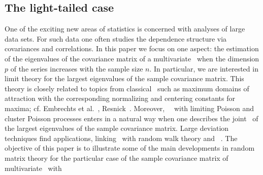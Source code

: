 \subsection{The light-tailed case}
One of the exciting new areas of statistics is concerned with analyses of large data sets.
For such data one often studies the dependence structure via covariances and correlations.
In this paper we focus on one aspect: the estimation of the eigenvalues of the covariance matrix of a multivariate  \ts\
when the dimension $p$ of the series increases with the sample size $n$. In particular, we are interested in limit theory for the largest eigenvalues of the sample covariance matrix. This theory is closely related to topics from classical \evt\ such as
maximum domains of attraction with the corresponding normalizing and centering constants for maxima; cf. Embrechts et al.~\cite{embrechts:kluppelberg:mikosch:1997}, Resnick~\cite{resnick:2007,resnick:1987}.
Moreover, \pp\ \con\ with limiting Poisson and cluster Poisson processes enters in a natural way when one describes
the joint \con\ of the largest eigenvalues of the sample covariance matrix. Large deviation techniques find applications,
linking \evt\ with random walk theory and \pp\ \con . The objective of this paper is to illustrate some of the main
developments in random matrix theory for the particular case of the sample covariance matrix of multivariate \ts\ with
